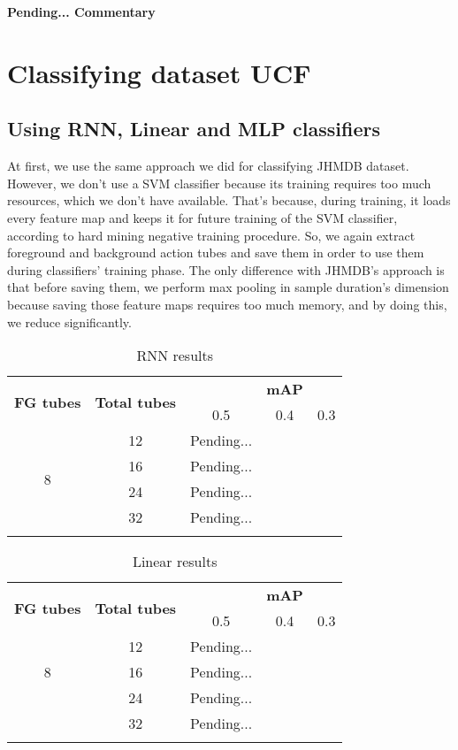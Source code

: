 \textbf{Pending... Commentary}

\section{Classifying dataset UCF}
\subsection{Using RNN, Linear and MLP classifiers}

At first, we use the same approach we did for classifying JHMDB dataset. However, we don't use a SVM classifier because its training requires too much resources, which we don't have available. That's
because, during training, it loads every feature map and keeps it for future training of the SVM classifier, according to hard mining negative training procedure. So, we again extract foreground
and background action tubes and save them in order to use them during classifiers' training phase. The only difference with JHMDB's approach is that before saving them, we perform max pooling in
sample duration's dimension because saving those feature maps requires too much memory, and by doing this, we reduce significantly.
\begin{center}
  \begin{longtable}{|| c | c || c c c ||}
    \hline
    \multirow{2}{*}{\textbf{FG tubes}} & \multirow{2}{*}{\textbf{Total tubes}} & {} & \textbf{mAP} & {} \\
    {} & {} & 0.5 & 0.4 & 0.3 \\
    \hline
    \multirow{4}{*}{8} & 12 & Pending...\\
    \cline{2-5}
    {} & 16 & Pending... \\
    \cline{2-5}
    {} & 24 & Pending... \\
    \cline{2-5}
    {} & 32 & Pending... \\
    \hline

  \caption{RNN results}
  \label{table:ucf_rnn}
\end{longtable}
\end{center}
  
\begin{center}
  \begin{longtable}{|| c | c || c c c ||}
    \hline
    \multirow{2}{*}{\textbf{FG tubes}} & \multirow{2}{*}{\textbf{Total tubes}} & {} & \textbf{mAP} & {} \\
    {} & {} & 0.5 & 0.4 & 0.3 \\
    \hline
    \multirow{3}{*}{8} & 12 & Pending...\\
    \cline{2-5}
    {} & 16 & Pending... \\
    \cline{2-5}
    {} & 24 & Pending... \\
    \cline{2-5}
    {} & 32 & Pending... \\
    \hline

  \caption{Linear results}
  \label{table:ucf_linear}
\end{longtable}
\end{center}

